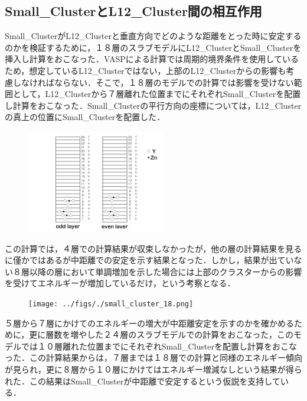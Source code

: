 \documentclass[10pt,a4j]{article}
\begin{document}
\subsection{Small\_ClusterとL12\_Cluster間の相互作用}
Small\_ClusterがL12\_Clusterと垂直方向でどのような距離をとった時に安定するのかを検証するために，１８層のスラブモデルにL12\_ClusterとSmall\_Clusterを挿入し計算をおこなった．VASPによる計算では周期的境界条件を使用しているため，想定しているL12\_Clusterではない，上部のL12\_Clusterからの影響も考慮しなければならない．そこで，１８層のモデルでの計算では影響を受けない範囲として，L12\_Clusterから７層離れた位置までにそれぞれSmall\_Clusterを配置し計算をおこなった．Small\_Clusterの平行方向の座標については，L12\_Clusterの真上の位置にSmall\_Clusterを配置した．

\begin{figure}[htbp]\begin{center}
\includegraphics[width=6cm,bb=0 0 442 500]{../figs/./small_cluster_slab.png}
\caption{}
\label{default}\end{center}\end{figure}
この計算では，４層での計算結果が収束しなかったが，他の層の計算結果を見るに僅かではあるが中距離での安定を示す結果となった．しかし，結果が出ていない８層以降の層において単調増加を示した場合には上部のクラスターからの影響を受けてエネルギーが増加しているだけ，という考察となる．

\begin{figure}[htbp]\begin{center}
\texttt{[image: ../figs/./small\_cluster\_18.png]}
\caption{}
\label{default}\end{center}\end{figure}
５層から７層にかけてのエネルギーの増大が中距離安定を示すのかを確かめるために，更に層数を増やした２４層のスラブモデルでの計算をおこなった，このモデルでは１０層離れた位置までにそれぞれSmall\_Clusterを配置し計算をおこなった．この計算結果からは，７層までは１８層での計算と同様のエネルギー傾向が見られ，更に８層から１０層にかけてはエネルギー増減なしという結果が得られた．この結果はSmall\_Clusterが中距離で安定するという仮説を支持している．
\end{document}

